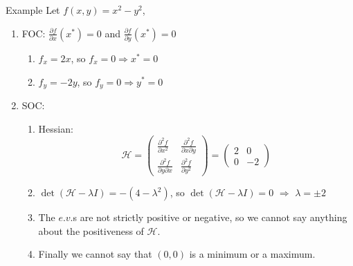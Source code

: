 \documentclass[aspectratio=169]{beamer}
\begin{document}
\begin{frame}{Example}
    Let $f(x,y)=x^2-y^2$,
    
    \begin{enumerate}
        \item FOC: $\frac{\partial f}{\partial x}(x^*)=0$ and $\frac{\partial f}{\partial y}(x^*)=0$
        \begin{enumerate}
            \item $f_{x}=2x$, so $f_{x}=0 \Rightarrow x^*=0$
            \item $f_{y}=-2y$, so $f_{y}=0 \Rightarrow y^*=0$
        \end{enumerate}
        \item SOC:
        \begin{enumerate}
            \item Hessian: $$\mathcal{H}=\begin{pmatrix}\frac{\partial^2 f}{\partial x^2} & \frac{\partial^2 f}{\partial x\partial y} \\ \frac{\partial^2 f}{\partial y\partial x} & \frac{\partial^2 f}{\partial y^2}\end{pmatrix}=\begin{pmatrix}2&0\\0&-2\end{pmatrix}$$
            \item $\det(\mathcal{H}-\lambda I) = -(4-\lambda^2)$, so $\det(\mathcal{H}-\lambda I)=0$ $\Rightarrow$ $\lambda=\pm2$
            \item The $e.v.$s are not strictly positive or negative, so we cannot say anything about the positiveness of $\mathcal{H}$.
            \item Finally we cannot say that $(0,0)$ is a minimum or a maximum.
        \end{enumerate}
    \end{enumerate}

\end{frame}
\end{document}
